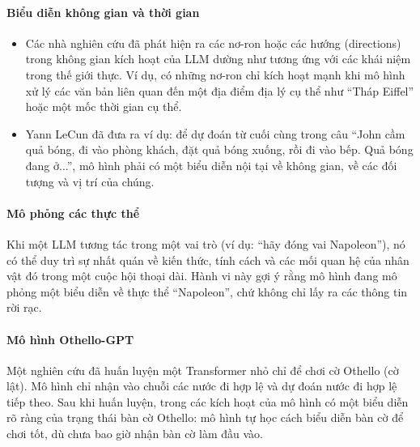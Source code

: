 \paragraph{Biểu diễn không gian và thời gian}
\begin{itemize}
    \item Các nhà nghiên cứu đã phát hiện ra các nơ-ron hoặc các hướng (directions) trong không gian kích hoạt của LLM dường như tương ứng với các khái niệm trong thế giới thực. Ví dụ, có những nơ-ron chỉ kích hoạt mạnh khi mô hình xử lý các văn bản liên quan đến một địa điểm địa lý cụ thể như “Tháp Eiffel” hoặc một mốc thời gian cụ thể.
    \item Yann LeCun đã đưa ra ví dụ: để dự đoán từ cuối cùng trong câu “John cầm quả bóng, đi vào phòng khách, đặt quả bóng xuống, rồi đi vào bếp. Quả bóng đang ở...”, mô hình phải có một biểu diễn nội tại về không gian, về các đối tượng và vị trí của chúng.
\end{itemize}

\paragraph{Mô phỏng các thực thể}
Khi một LLM tương tác trong một vai trò (ví dụ: “hãy đóng vai Napoleon”), nó có thể duy trì sự nhất quán về kiến thức, tính cách và các mối quan hệ của nhân vật đó trong một cuộc hội thoại dài. Hành vi này gợi ý rằng mô hình đang mô phỏng một biểu diễn về thực thể “Napoleon”, chứ không chỉ lấy ra các thông tin rời rạc.

\paragraph{Mô hình Othello-GPT}
Một nghiên cứu đã huấn luyện một Transformer nhỏ chỉ để chơi cờ Othello (cờ lật). Mô hình chỉ nhận vào chuỗi các nước đi hợp lệ và dự đoán nước đi hợp lệ tiếp theo. Sau khi huấn luyện, trong các kích hoạt của mô hình có một biểu diễn rõ ràng của trạng thái bàn cờ Othello: mô hình tự học cách biểu diễn bàn cờ để chơi tốt, dù chưa bao giờ nhận bàn cờ làm đầu vào.

\begin{center}
    \label{fig:othello_gpt}
\end{center}

